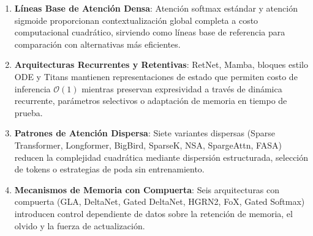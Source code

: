 \documentclass[11pt,a4paper]{article}
\begin{document}
\begin{enumerate}[leftmargin=*]
    \item \textbf{Líneas Base de Atención Densa}: Atención softmax estándar y atención sigmoide proporcionan contextualización global completa a costo computacional cuadrático, sirviendo como líneas base de referencia para comparación con alternativas más eficientes.
    \item \textbf{Arquitecturas Recurrentes y Retentivas}: RetNet, Mamba, bloques estilo ODE y Titans mantienen representaciones de estado que permiten costo de inferencia $\mathcal{O}(1)$ mientras preservan expresividad a través de dinámica recurrente, parámetros selectivos o adaptación de memoria en tiempo de prueba.
    \item \textbf{Patrones de Atención Dispersa}: Siete variantes dispersas (Sparse Transformer, Longformer, BigBird, SparseK, NSA, SpargeAttn, FASA) reducen la complejidad cuadrática mediante dispersión estructurada, selección de tokens o estrategias de poda sin entrenamiento.
    \item \textbf{Mecanismos de Memoria con Compuerta}: Seis arquitecturas con compuerta (GLA, DeltaNet, Gated DeltaNet, HGRN2, FoX, Gated Softmax) introducen control dependiente de datos sobre la retención de memoria, el olvido y la fuerza de actualización.
\end{enumerate}
\end{document}
